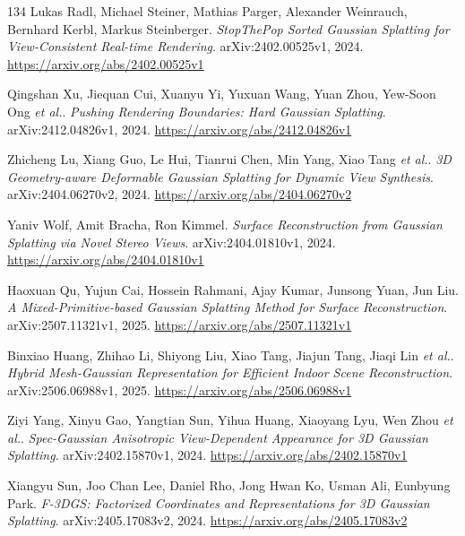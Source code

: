 \documentclass[11pt,a4paper]{article}
\begin{document}
\begin{thebibliography}{134}
Lukas Radl, Michael Steiner, Mathias Parger, Alexander Weinrauch, Bernhard Kerbl, Markus Steinberger.
\newblock \emph{StopThePop Sorted Gaussian Splatting for View-Consistent Real-time Rendering}.
\newblock arXiv:2402.00525v1, 2024.
\newblock \url{https://arxiv.org/abs/2402.00525v1}

Qingshan Xu, Jiequan Cui, Xuanyu Yi, Yuxuan Wang, Yuan Zhou, Yew-Soon Ong \emph{et al.}.
\newblock \emph{Pushing Rendering Boundaries: Hard Gaussian Splatting}.
\newblock arXiv:2412.04826v1, 2024.
\newblock \url{https://arxiv.org/abs/2412.04826v1}

Zhicheng Lu, Xiang Guo, Le Hui, Tianrui Chen, Min Yang, Xiao Tang \emph{et al.}.
\newblock \emph{3D Geometry-aware Deformable Gaussian Splatting for Dynamic View Synthesis}.
\newblock arXiv:2404.06270v2, 2024.
\newblock \url{https://arxiv.org/abs/2404.06270v2}

Yaniv Wolf, Amit Bracha, Ron Kimmel.
\newblock \emph{Surface Reconstruction from Gaussian Splatting via Novel Stereo Views}.
\newblock arXiv:2404.01810v1, 2024.
\newblock \url{https://arxiv.org/abs/2404.01810v1}

Haoxuan Qu, Yujun Cai, Hossein Rahmani, Ajay Kumar, Junsong Yuan, Jun Liu.
\newblock \emph{A Mixed-Primitive-based Gaussian Splatting Method for Surface Reconstruction}.
\newblock arXiv:2507.11321v1, 2025.
\newblock \url{https://arxiv.org/abs/2507.11321v1}

Binxiao Huang, Zhihao Li, Shiyong Liu, Xiao Tang, Jiajun Tang, Jiaqi Lin \emph{et al.}.
\newblock \emph{Hybrid Mesh-Gaussian Representation for Efficient Indoor Scene Reconstruction}.
\newblock arXiv:2506.06988v1, 2025.
\newblock \url{https://arxiv.org/abs/2506.06988v1}

Ziyi Yang, Xinyu Gao, Yangtian Sun, Yihua Huang, Xiaoyang Lyu, Wen Zhou \emph{et al.}.
\newblock \emph{Spec-Gaussian Anisotropic View-Dependent Appearance for 3D Gaussian Splatting}.
\newblock arXiv:2402.15870v1, 2024.
\newblock \url{https://arxiv.org/abs/2402.15870v1}

Xiangyu Sun, Joo Chan Lee, Daniel Rho, Jong Hwan Ko, Usman Ali, Eunbyung Park.
\newblock \emph{F-3DGS: Factorized Coordinates and Representations for 3D Gaussian Splatting}.
\newblock arXiv:2405.17083v2, 2024.
\newblock \url{https://arxiv.org/abs/2405.17083v2}


\end{thebibliography}
\end{document}
